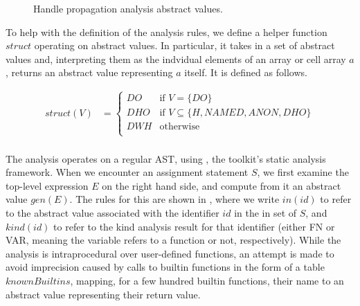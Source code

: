 \begin{figure}
\centering
{}
\caption{Handle propagation analysis abstract values.}
\label{fig:HandleLattice}
\end{figure}

To help with the definition of the analysis rules, we define a helper function
$struct$ operating on abstract values. In particular, it takes in a set of
abstract values and, interpreting them as the indvidual elements of an array or
cell array $a$, returns an abstract value representing $a$ itself. It is
defined as follows.

\begin{align*}
struct(V) &= \begin{cases}
  DO & \text{if } V = \lbrace DO \rbrace \\
  DHO & \text{if } V \subseteq \lbrace H, NAMED, ANON, DHO \rbrace \\
  DWH & \text{otherwise} \\
\end{cases} \\
\end{align*}

The analysis operates on a regular \matlab AST, using \mcsaf, the \mclab
toolkit's static analysis framework. When we encounter an assignment statement
$S$, we first examine the top-level expression $E$ on the right hand side, and
compute from it an abstract value $gen(E)$. The rules for this are shown in
, where we write $in(id)$ to refer to the
abstract value associated with the identifier $id$ in the in set of $S$, and
$kind(id)$ to refer to the kind analysis result for that identifier (either FN
or VAR, meaning the variable refers to a function or not, respectively). While
the analysis is intraprocedural over user-defined functions, an attempt is made
to avoid imprecision caused by calls to builtin functions in the form of a
table $knownBuiltins$, mapping, for a few hundred builtin functions, their name
to an abstract value representing their return value.

